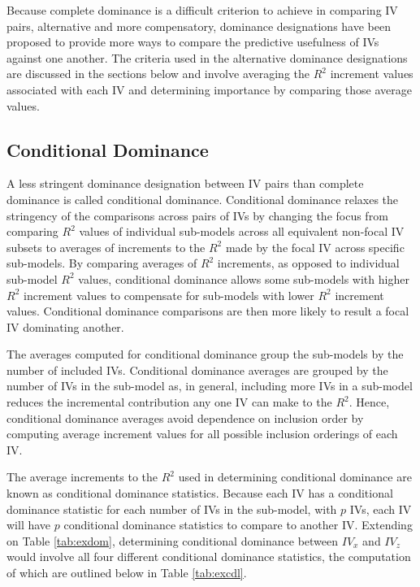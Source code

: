 \documentclass[doc]{apa7}
\begin{document}
	Because complete dominance is a difficult criterion to achieve in comparing IV pairs, alternative and more compensatory, dominance designations have been proposed to provide more ways to compare the predictive usefulness of IVs against one another.
	The criteria used in the alternative dominance designations are discussed in the sections below and involve averaging the $R^2$ increment values associated with each IV and determining importance by comparing those average values.
	
	\subsection{Conditional Dominance}
	
	A less stringent dominance designation between IV pairs than complete dominance is called conditional dominance.
	Conditional dominance relaxes the stringency of the comparisons across pairs of IVs by changing the focus from comparing $R^2$ values of individual sub-models across all equivalent non-focal IV subsets to averages of increments to the $R^2$ made by the focal IV across specific sub-models.	
	By comparing averages of $R^2$ increments, as opposed to individual sub-model $R^2$ values, conditional dominance allows some sub-models with higher $R^2$ increment values to compensate for sub-models with lower $R^2$ increment values.
	Conditional dominance comparisons are then more likely to result a focal IV dominating another.
	
	The averages computed for conditional dominance group the sub-models by the number of included IVs.
	Conditional dominance averages are grouped by the number of IVs in the sub-model as, in general, including more IVs in a sub-model reduces the incremental contribution any one IV can make to the $R^2$.
	Hence, conditional dominance averages avoid dependence on inclusion order by computing average increment values for all possible inclusion orderings of each IV.
	
	The average increments to the $R^2$ used in determining conditional dominance are known as conditional dominance statistics.
	Because each IV has a conditional dominance statistic for each number of IVs in the sub-model, with $p$ IVs, each IV will have $p$ conditional dominance statistics to compare to another IV.
	Extending on Table \ref{tab:exdom}, determining conditional dominance between $IV_x$ and $IV_z$ would involve all four different conditional dominance statistics, the computation of which are outlined below in Table \ref{tab:excdl}.
	
\end{document}
